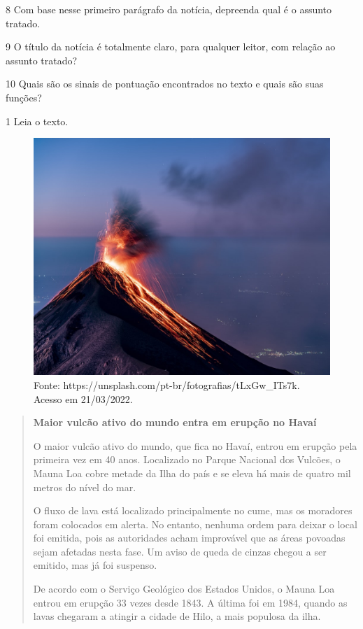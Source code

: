 \num{8} Com base nesse primeiro parágrafo da notícia, depreenda qual é o assunto tratado.



\num{9} O título da notícia é totalmente claro, para qualquer leitor, com relação ao assunto tratado?



\num{10} Quais são os sinais de pontuação encontrados no texto e quais são
suas funções?




\num{1} Leia o texto.

\begin{figure}[htpb!]
\includegraphics[width=.5\textwidth]{./imgs/img9.jpg}
\caption{Fonte: https://unsplash.com/pt-br/fotografias/tLxGw\_ITs7k. Acesso em 21/03/2022.}
\end{figure}

\begin{quote}
\textbf{Maior vulcão ativo do mundo entra em erupção no Havaí}

O maior vulcão ativo do mundo, que fica no Havaí, entrou em erupção pela primeira vez em 40 anos. Localizado no Parque Nacional dos Vulcões, o Mauna Loa cobre metade da Ilha do país e se eleva há mais de quatro mil metros do nível do mar.

O fluxo de lava está localizado principalmente no cume, mas os moradores foram colocados em alerta. No entanto, nenhuma ordem para deixar o local foi emitida, pois as autoridades acham improvável que as áreas povoadas sejam afetadas nesta fase. Um aviso de queda de cinzas chegou a ser emitido, mas já foi suspenso.

De acordo com o Serviço Geológico dos Estados Unidos, o Mauna Loa entrou em erupção 33 vezes desde 1843. A última foi em 1984, quando as lavas chegaram a atingir a cidade de Hilo, a mais populosa da ilha.

\end{quote}

